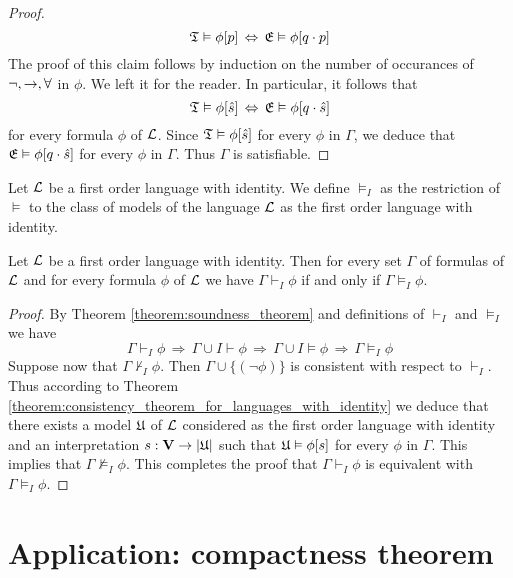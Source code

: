 \begin{proof}
$${\mathfrak T} \vDash \phi[p]\,\Leftrightarrow\,{\mathfrak E}\vDash\phi[q\cdot p]$$
The proof of this claim follows by induction on the number of occurances of $\neg, \rightarrow,\forall$ in $\phi$. We left it for the reader. In particular, it follows that
$${\mathfrak T} \vDash \phi[\hat{s}]\,\Leftrightarrow\,{\mathfrak E}\vDash\phi[q\cdot \hat{s}]$$
for every formula $\phi$ of ${\mathcal L}$. Since ${\mathfrak T} \vDash \phi[\hat{s}]$ for every $\phi$ in $\Gamma$, we deduce that ${\mathfrak E}\vDash \phi[q\cdot \hat{s}]$ for every $\phi$ in $\Gamma$. Thus $\Gamma$ is satisfiable.
\end{proof}

\begin{definition}
Let ${\mathcal L}$ be a first order language with identity. We define $\vDash_I$ as the restriction of $\vDash$ to the class of models of the language ${\mathcal L}$ as the first order language with identity.
\end{definition}

\begin{corollary}\label{corollary:Gödels_completeness_theorem_for_languages_with_identity}
Let ${\mathcal L}$ be a first order language with identity. Then for every set $\Gamma$ of formulas of ${\mathcal L}$ and for every formula $\phi$ of ${\mathcal L}$ we have $\Gamma \vdash_I \phi$ if and only if $\Gamma \vDash_I \phi$.
\end{corollary}
\begin{proof}
By Theorem \ref{theorem:soundness_theorem} and definitions of $\vdash_I$ and $\vDash_I$ we have
$$\Gamma\vdash_I \phi\,\Rightarrow\,\Gamma\cup I\vdash \phi\,\Rightarrow\,\Gamma\cup I\vDash \phi\,\Rightarrow\,\Gamma\vDash_I\phi$$
Suppose now that $\Gamma \nvdash_I \phi$. Then $\Gamma\cup \{(\neg \phi)\}$ is consistent with respect to $\vdash_I$. Thus according to Theorem \ref{theorem:consistency_theorem_for_languages_with_identity} we deduce that there exists a model ${\mathfrak U}$ of ${\mathcal L}$ considered as the first order language with identity and an interpretation $s:\mathbf{V}\rightarrow |{\mathfrak U}|$ such that ${\mathfrak U} \vDash \phi[s]$ for every $\phi$ in $\Gamma$. This implies that $\Gamma \nvDash_I \phi$. This completes the proof that $\Gamma \vdash_I \phi$ is equivalent with $\Gamma \vDash_I \phi$.
\end{proof}

\section{Application: compactness theorem}

